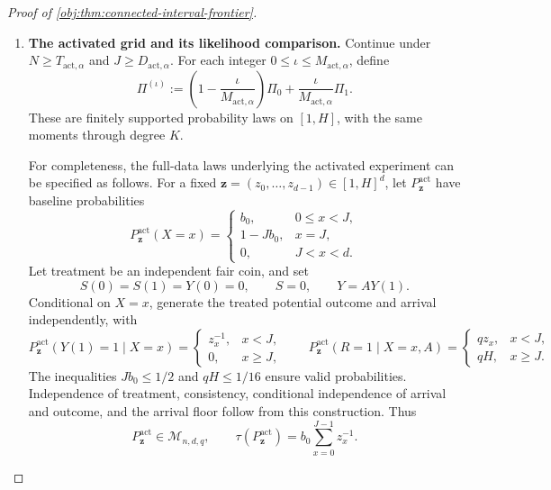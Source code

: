 \begin{proof}[Proof of \cref{obj:thm:connected-interval-frontier}]
\begin{enumerate}
Suppose first that \(N\ge T_{\mathrm{act},\alpha}\). Since \(\ell\ge1\),
\[
D_{\mathrm{act},\alpha}
\le \frac{N}{2\eta}
\le \frac{N\ell}{2\eta}
=\frac1{2b_0}.
\]
Also,
\[
b_0\le\frac{\eta}{N}\le\frac14,\qquad
\ell\ge2,\qquad K\ge2.
\]
The ceiling bound \(K\le\ell+1\le2\ell\), together with the slice restriction,
gives
\[
qH=qK^2\le4q\ell^2\le\frac1{16}.
\]
By \cref{obj:lem:moment-matched-reciprocal-priors}, choose finitely supported
probability laws \(\Pi_0,\Pi_1\) on \([1,H]\) with matching moments through
degree \(K\). Interchange their names if necessary and define
\[
\mu_{\mathrm{rec},i}:=\int z^{-1}\,d\Pi_i(z)
\quad(i=0,1).
\]
Then
\[
\int z^v\,d\Pi_0(z)=\int z^v\,d\Pi_1(z)
\quad(0\le v\le K),
\qquad
\mu_{\mathrm{rec},1}-\mu_{\mathrm{rec},0}\ge\frac1{12}.
\]

We will show that whenever \(J\ge D_{\mathrm{act},\alpha}\),
\[
c_{\mathrm{act},\alpha}s_{\mathrm{many}}
\le\mathfrak L_{n,d,q,\alpha}.
\]

\item \textbf{The activated grid and its likelihood comparison.}
Continue under
\(N\ge T_{\mathrm{act},\alpha}\) and \(J\ge D_{\mathrm{act},\alpha}\).
For each integer \(0\le\iota\le M_{\mathrm{act},\alpha}\), define
\[
\Pi^{(\iota)}
:=
\left(1-\frac{\iota}{M_{\mathrm{act},\alpha}}\right)\Pi_0
+\frac{\iota}{M_{\mathrm{act},\alpha}}\Pi_1.
\]
These are finitely supported probability laws on \([1,H]\), with the same
moments through degree \(K\).

For completeness, the full-data laws underlying the activated experiment
can be specified as follows. For a fixed
\(\mathbf z=(z_0,\ldots,z_{d-1})\in[1,H]^d\), let
\(P^{\mathrm{act}}_{\mathbf z}\) have baseline probabilities
\[
P^{\mathrm{act}}_{\mathbf z}(X=x)
=
\begin{cases}
b_0,&0\le x<J,\\
1-Jb_0,&x=J,\\
0,&J<x<d.
\end{cases}
\]
Let treatment be an independent fair coin, and set
\[
S(0)=S(1)=Y(0)=0,\qquad S=0,\qquad Y=AY(1).
\]
Conditional on \(X=x\), generate the treated potential outcome and arrival
independently, with
\[
P^{\mathrm{act}}_{\mathbf z}(Y(1)=1\mid X=x)
=
\begin{cases}
z_x^{-1},&x<J,\\
0,&x\ge J,
\end{cases}
\qquad
P^{\mathrm{act}}_{\mathbf z}(R=1\mid X=x,A)
=
\begin{cases}
qz_x,&x<J,\\
qH,&x\ge J.
\end{cases}
\]
The inequalities \(Jb_0\le1/2\) and \(qH\le1/16\) ensure valid
probabilities. Independence of treatment, consistency, conditional
independence of arrival and outcome, and the arrival floor follow from
this construction. Thus
\[
P^{\mathrm{act}}_{\mathbf z}\in\mathcal M_{n,d,q},
\qquad
\tau(P^{\mathrm{act}}_{\mathbf z})
=b_0\sum_{x=0}^{J-1}z_x^{-1}.
\]


\end{enumerate}
\end{proof}
